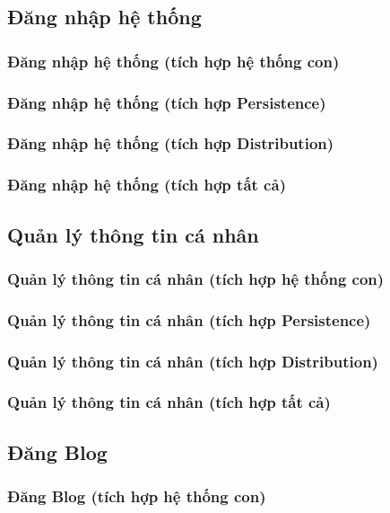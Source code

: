 \documentclass[./../main.tex]{subfiles}
\begin{document}
\subsection{Đăng nhập hệ thống}
\subsubsection{Đăng nhập hệ thống (tích hợp hệ thống con)}
\subsubsection{Đăng nhập hệ thống (tích hợp Persistence)}
\subsubsection{Đăng nhập hệ thống (tích hợp Distribution)}
\subsubsection{Đăng nhập hệ thống (tích hợp tất cả)}

\subsection{Quản lý thông tin cá nhân}
\subsubsection{Quản lý thông tin cá nhân (tích hợp hệ thống con)}
\subsubsection{Quản lý thông tin cá nhân (tích hợp Persistence)}
\subsubsection{Quản lý thông tin cá nhân (tích hợp Distribution)}
\subsubsection{Quản lý thông tin cá nhân (tích hợp tất cả)}

\subsection{Đăng Blog}
\subsubsection{Đăng Blog (tích hợp hệ thống con)}
\end{document}
